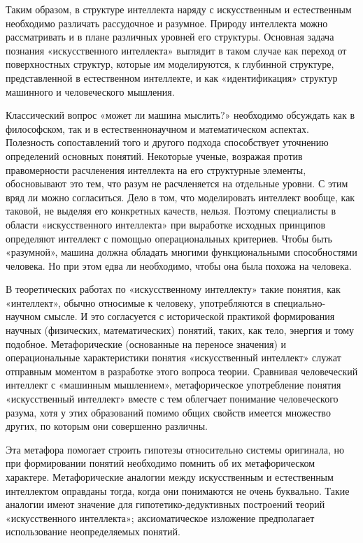 \documentclass[14pt]{extarticle}
\begin{document}
Таким образом, в структуре интеллекта наряду с искусственным и естественным необходимо различать рассудочное и разумное. Природу интеллекта можно рассматривать и в плане различных уровней его структуры. Основная задача познания «искусственного интеллекта» выглядит в таком случае как переход от поверхностных структур, которые им моделируются, к глубинной структуре, представленной в естественном интеллекте, и как «идентификация» структур машинного и человеческого мышления.

Классический вопрос «может ли машина мыслить?» необходимо обсуждать как в философском, так и в естественнонаучном и математическом аспектах. Полезность сопоставлений того и другого подхода способствует уточнению определений основных понятий. Некоторые ученые, возражая против правомерности расчленения интеллекта на его структурные элементы, обосновывают это тем, что разум не расчленяется на отдельные уровни. С этим вряд ли можно согласиться. Дело в том, что моделировать интеллект вообще, как таковой, не выделяя его конкретных качеств, нельзя. Поэтому специалисты в области «искусственного интеллекта» при выработке исходных принципов определяют интеллект с помощью операциональных критериев. Чтобы быть «разумной», машина должна обладать многими функциональными способностями человека. Но при этом едва ли необходимо, чтобы она была похожа на человека.

В теоретических работах по «искусственному интеллекту» такие понятия, как «интеллект», обычно относимые к человеку, употребляются в специально-научном смысле. И это согласуется с исторической практикой формирования научных (физических, математических) понятий, таких, как тело, энергия и тому подобное. Метафорические (основанные на переносе значения) и операциональные характеристики понятия «искусственный интеллект» служат отправным моментом в разработке этого вопроса теории. Сравнивая человеческий интеллект с «машинным мышлением», метафорическое употребление понятия «искусственный интеллект» вместе с тем облегчает понимание человеческого разума, хотя у этих образований помимо общих свойств имеется множество других, по которым они совершенно различны.

Эта метафора помогает строить гипотезы относительно системы оригинала, но при формировании понятий необходимо помнить об их метафорическом характере. Метафорические аналогии между искусственным и естественным интеллектом оправданы тогда, когда они понимаются не очень буквально. Такие аналогии имеют значение для гипотетико-дедуктивных построений теорий «искусственного интеллекта»; аксиоматическое изложение предполагает использование неопределяемых понятий.
\end{document}
